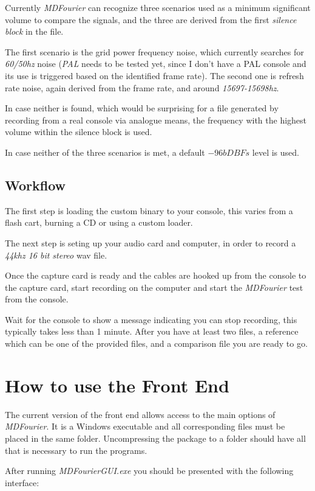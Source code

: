 \documentclass[10pt,a4paper]{report}
\begin{document}
Currently \textit{MDFourier} can recognize three scenarios used as a minimum significant volume to compare the signals, and the three are derived from the first \textit{silence block} in the file.

The first scenario is the grid power frequency noise, which currently searches for \textit{60/50hz} noise (\textit{PAL} needs to be tested yet, since I don't have a PAL console and its use is triggered based on the identified frame rate). The second one is refresh rate noise, again derived from the frame rate, and around \textit{15697-15698hz}. 

In case neither is found, which would be surprising for a file generated by recording from a real console via analogue means, the frequency with the highest volume within the silence block is used. 

In case neither of the three scenarios is met, a default $-96bDBFs$ level is used.


\section{Workflow}

The first step is loading the custom binary to your console, this varies from a flash cart, burning a CD or using a custom loader.

The next step is seting up your audio card and computer, in order to record a \textit{44khz 16 bit stereo} wav file.

Once the capture card is ready and the cables are hooked up from the console to the capture card, start recording on the computer and start the \textit{MDFourier} test from the console.

Wait for the console to show a message indicating you can stop recording, this typically takes less than 1 minute. After you have at least two files, a reference which can be one of the provided files, and a comparison file you are ready to go. 

\chapter{How to use the Front End}
\label{usinggui}
The current version of the front end allows access to the main options of \textit{MDFourier}. It is a Windows executable and all corresponding files must be placed in the same folder. Uncompressing the package to a folder should have all that is necessary to run the programs.

After running \textit{MDFourierGUI.exe} you should be presented with the following interface:
\end{document}
